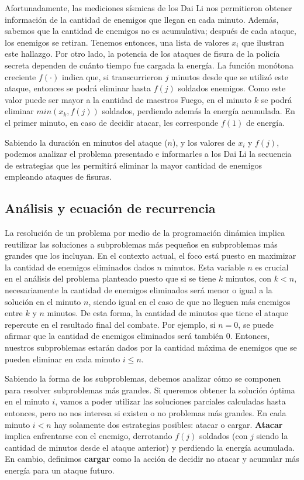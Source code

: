 \documentclass{article}
\begin{document}
Afortunadamente, las mediciones sísmicas de los Dai Li nos permitieron obtener información de la cantidad de enemigos que llegan en cada minuto. Además, sabemos que la cantidad de enemigos no es acumulativa; después de cada ataque, los enemigos se retiran. Tenemos entonces, una lista de valores $x_i$ que ilustran este hallazgo. Por otro lado, la potencia de los ataques de fisura de la policía secreta dependen de cuánto tiempo fue cargada la energía. La función monótona creciente $f(\cdot)$ indica que, si transcurrieron $j$ minutos desde que se utilizó este ataque, entonces se podrá eliminar hasta  $f(j)$ soldados enemigos. Como este valor puede ser mayor a la cantidad de maestros Fuego, en el minuto $k$ se podrá eliminar $min(x_k, f(j))$ soldados, perdiendo además la energía acumulada. En el primer minuto, en caso de decidir atacar, les corresponde $f(1)$ de energía.

Sabiendo la duración en minutos del ataque ($n$), y los valores de $x_i$ y $f(j)$, podemos analizar el problema presentado e informarles a los Dai Li la secuencia de estrategias que les permitirá eliminar la mayor cantidad de enemigos empleando ataques de fisuras.

\subsection{Análisis y ecuación de recurrencia}

La resolución de un problema por medio de la programación dinámica implica reutilizar las soluciones a subproblemas más pequeños en subproblemas más grandes que los incluyan. En el contexto actual, el foco está puesto en maximizar la cantidad de enemigos eliminados dados $n$ minutos. Esta variable $n$ es crucial en el análisis del problema planteado puesto que si se tiene $k$ minutos, con $k < n$, necesariamente la cantidad de enemigos eliminados será menor o igual a la solución en el minuto $n$, siendo igual en el caso de que no lleguen más enemigos entre $k$ y $n$ minutos. De esta forma, la cantidad de minutos que tiene el ataque repercute en el resultado final del combate. Por ejemplo, si $n = 0$, se puede afirmar que la cantidad de enemigos eliminados será también 0. Entonces, nuestros subproblemas estarán dados por la cantidad máxima de enemigos que se pueden eliminar en cada minuto $i \leq n$.

Sabiendo la forma de los subproblemas, debemos analizar cómo se componen para resolver subproblemas más grandes. Si queremos obtener la solución óptima en el minuto $i$, vamos a poder utilizar las soluciones parciales calculadas hasta entonces, pero no nos interesa si existen o no problemas más grandes. En cada minuto $i < n$ hay solamente dos estrategias posibles: atacar o cargar. \textbf{Atacar} implica enfrentarse con el enemigo, derrotando $f(j)$ soldados (con $j$ siendo la cantidad de minutos desde el ataque anterior) y perdiendo la energía acumulada. En cambio, definimos \textbf{cargar} como la acción de decidir no atacar y acumular más energía para un ataque futuro. 
\end{document}
